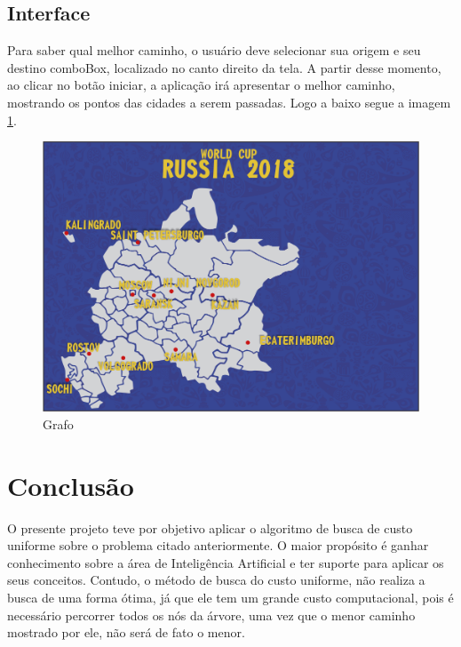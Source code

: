 \documentclass[12pt]{article}
\begin{document}
\subsection{Interface}
Para saber qual melhor caminho, o usuário deve selecionar sua origem e seu destino comboBox, localizado no canto direito da tela. A partir desse momento, ao clicar no botão iniciar, a aplicação irá apresentar o melhor caminho, mostrando os pontos das cidades a serem passadas. Logo a baixo segue a imagem \ref{fig:fig2}.
\begin{figure}[H]
	\centering
	\includegraphics[width=0.9\columnwidth]{imagem/TELAESBOCO}
	\caption{Grafo}
	\label{fig:fig2}
\end{figure}

\section{Conclusão}
O presente projeto teve por objetivo aplicar o algoritmo de busca de custo uniforme sobre o problema citado anteriormente. O maior propósito é ganhar conhecimento sobre a área de Inteligência Artificial e ter suporte para aplicar os seus conceitos. Contudo, o método de busca do custo uniforme, não realiza a busca de uma forma ótima, já que ele tem um grande custo computacional, pois é necessário percorrer todos os nós da árvore, uma vez que o menor caminho mostrado por ele, não será de fato o menor.
\end{document}
